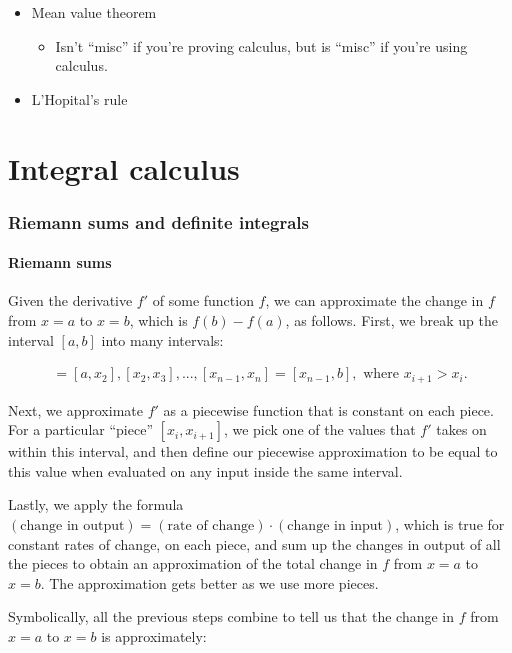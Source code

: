 \begin{itemize}
    \item Mean value theorem
    \begin{itemize}
        \item Isn't ``misc'' if you're proving calculus, but is ``misc'' if you're using calculus.
    \end{itemize}
    \item L'Hopital's rule
\end{itemize}

\newpage

\part*{Integral calculus}

\section*{Riemann sums and definite integrals}

\subsection*{Riemann sums}

Given the derivative $f'$ of some function $f$, we can approximate the change in $f$ from $x = a$ to $x = b$, which is $f(b) - f(a)$, as follows. First, we break up the interval $[a, b]$ into many intervals:

\begin{align*}
    [x_1, x_2] = [a, x_2], [x_2, x_3], ..., [x_{n - 1}, x_n] = [x_{n - 1}, b], \text{ where $x_{i + 1} > x_i$}.
\end{align*}

Next, we approximate $f'$ as a piecewise function that is constant on each piece. For a particular ``piece'' $[x_i, x_{i + 1}]$, we pick one of the values that $f'$ takes on within this interval, and then define our piecewise approximation to be equal to this value when evaluated on any input inside the same interval.

Lastly, we apply the formula $(\text{change in output}) = (\text{rate of change}) \cdot (\text{change in input})$, which is true for constant rates of change, on each piece, and sum up the changes in output of all the pieces to obtain an approximation of the total change in $f$ from $x = a$ to $x = b$. The approximation gets better as we use more pieces. 

Symbolically, all the previous steps combine to tell us that the change in $f$ from $x = a$ to $x = b$ is approximately:
 
